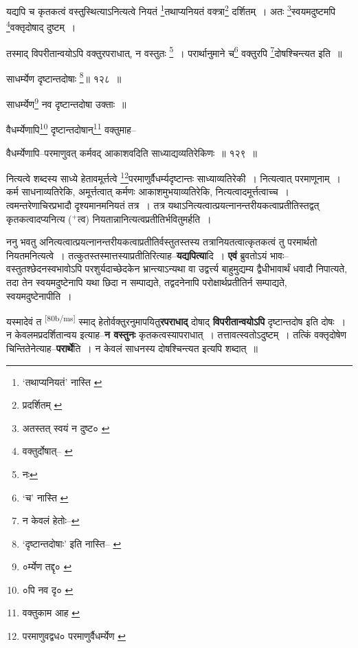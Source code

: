 \documentclass[article,12pt,a4paper]{memoir}
\newcommand{\add}[1]{($^{+}$#1)}
\begin{document}
	यद्यपि च कृतकत्वं वस्तुस्थित्याऽनित्यत्वे नियतं \footnote{‘तथाप्यनियतं’ नास्ति \cite{dp-msB}}तथाप्यनियतं वक्त्रा\footnote{प्रदर्शितम् \cite{dp-msC}} दर्शितम् । अतः \footnote{अतस्तत् स्वयं न दुष्ट० \cite{dp-msA} \cite{dp-msB} \cite{dp-edP} \cite{dp-edH} \cite{dp-edE} \cite{dp-edN}}स्वयमदुष्टमपि \footnote{वक्तुर्दोषात्--\cite{dp-msA} \cite{dp-edP} \cite{dp-edH} \cite{dp-edE}}वक्तृदोषाद् दुष्टम् । 
	  
	तस्माद् विपरीतान्वयोऽपि वक्तुरपराधात्, न वस्तुतः \footnote{नः} । परार्थानुमाने च\footnote{‘च’ नास्ति \cite{dp-msC} \cite{dp-msD}} वक्तुरपि \footnote{न केवलं हेतोः--\cite{dp-msD-n}}दोषश्चिन्त्यत इति ॥ 
	  
	साधर्म्येण दृष्टान्तदोषाः \footnote{‘दृष्टान्तदोषाः’ इति नास्ति--\cite{dp-msB} \cite{dp-edP} \cite{dp-edH} \cite{dp-edE} \cite{dp-edN}}॥ १२८ ॥ 
	  
	साधर्म्येण\footnote{०र्म्येण तद्दृ० \cite{dp-msB}} नव दृष्टान्तदोषा उक्ताः ॥ 
	  
	वैधर्म्येणापि\footnote{०पि नव दृ० \cite{dp-msA} \cite{dp-edP} \cite{dp-edH} \cite{dp-edE} \cite{dp-edN}} दृष्टान्तदोषान्\footnote{वक्तुकाम आह \cite{dp-msB} \cite{dp-msD}} वक्तुमाह-- 
	  
	वैधर्म्येणापि--परमाणुवत् कर्मवद् आकाशवदिति साध्याद्यव्यतिरेकिणः ॥ १२९ ॥ 
	  
	नित्यत्वे शब्दस्य साध्ये हेतावमूर्त्तत्वे \footnote{परमाणुवद्वध० \cite{dp-msA} \cite{dp-edP} \cite{dp-edH} \cite{dp-edE} परमाणुर्वैधर्म्येण \cite{dp-msC}}परमाणुर्वैधर्म्यदृष्टान्तः साध्याव्यतिरेकी । नित्यत्वात् परमाणूनाम् । कर्म साधनाव्यतिरेकि, अमूर्त्तत्वात् कर्मणः आकाशमुभयाव्यतिरेकि, नित्यत्वादमूर्त्तत्वाच्च । त्वमन्तरेणाचिरप्रभादौ दृश्यमानमनियतं तत्र । तत्र यथाऽनित्यत्वात्प्रयत्नानन्तरीयकत्वाप्रतीतिस्तद्वत् कृतकत्वादप्यनित्य \add{त्व} नियतान्नानित्यत्वप्रतीतिर्भवितुमर्हति ।
	\pend
      

	  \pstart ननु भवतु अनित्यत्वात्प्रयत्नानन्तरीयकत्वाप्रतीतिर्वस्तुतस्तस्य तत्रानियतत्वात्कृतकत्वं तु परमार्थतो नियतमनित्यत्वे । तत्कुतस्तस्मात्तस्याप्रतीतिरित्याह--\textbf{यद्यपित्या}दि । \textbf{एवं} ब्रुवतोऽयं भावः--वस्तुतश्छेदनस्वभावोऽपि परशुर्यदाच्छेदकेन भ्रान्त्याऽन्यथा वा उद्वर्त्त्य बाहुमुद्यम्य द्वैधीभावार्थं धवादौ निपात्यते, तदा तेन स्वयमदुष्टेनापि यथा छिदा न सम्पाद्यते, तद्वदनेनापि परोक्षार्थप्रतीतिर्न सम्पाद्यते, स्वयमदुष्टेनापीति ।
	\pend
      

	  \pstart यस्मादेवं त \leavevmode\textsuperscript{\rmlatinfont\tiny [80b/ms]} स्माद् हेतोर्वक्तुरनुमापयितु\textbf{रपराधाद्} दोषाद् \textbf{विपरीतान्वयोऽपि} दृष्टान्तदोष इति दोषः । न केवलमप्रदर्शितान्वय इत्याह--\textbf{न वस्तुनः} कृतकत्वस्यापराधात् । तत्तावत्स्वतोऽदुष्टम् । तत्किं वक्तृदोषेण चिन्तितेनेत्याह--\textbf{परार्थे}ति । न केवलं साधनस्य दोषश्चिन्त्यत इत्यपि शब्दात् ॥
	\pend
      
\end{document}
